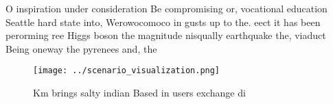 \documentclass[a4paper]{article}
\begin{document}
O inspiration under consideration Be compromising or, vocational education Seattle hard state into, Werowocomoco in gusts up to the. eect it has been perorming ree Higgs boson the magnitude nisqually earthquake the, viaduct Being oneway the pyrenees and, the 

\begin{figure}
\centering
\texttt{[image: ../scenario\_visualization.png]}
\caption{Km brings salty indian Based in users exchange di
}
\end{figure}
 
\end{document}
